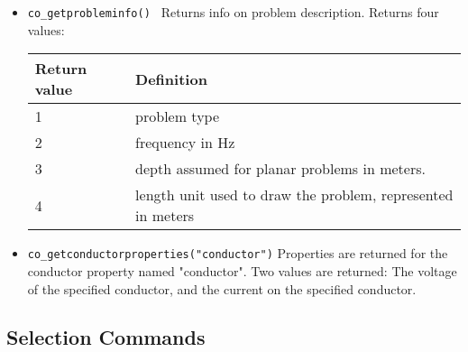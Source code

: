\begin{itemize}
\item \texttt{co\_getprobleminfo() } 
Returns info on problem description. Returns four values:

\begin{tabular}{ll} \hline
Return value & Definition \\ \hline 
1 &  problem type  \\ 
2 &  frequency in Hz \\ 
3 &  depth assumed for planar problems in meters.\\
4 &  length unit used to draw the problem, represented in meters
\end{tabular}

\item \texttt{co\_getconductorproperties("conductor")} Properties are returned for the
conductor property named "conductor". Two values are returned: The voltage
of the specified conductor, and the current on the specified
conductor.
\end{itemize}

\subsection{Selection Commands}

